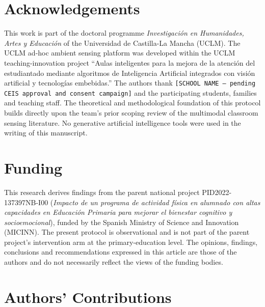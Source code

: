 
\section*{Acknowledgements}\label{sec:ack}

This work is part of the doctoral programme \emph{Investigación en Humanidades, Artes y Educación} of the Universidad de Castilla-La Mancha (UCLM). The UCLM ad-hoc ambient sensing platform was developed within the UCLM teaching-innovation project ``Aulas inteligentes para la mejora de la atención del estudiantado mediante algoritmos de Inteligencia Artificial integrados con visión artificial y tecnologías embebidas.'' The authors thank \texttt{[SCHOOL NAME --- pending CEIS approval and consent campaign]} and the participating students, families and teaching staff. The theoretical and methodological foundation of this protocol builds directly upon the team's prior scoping review of the multimodal classroom sensing literature. No generative artificial intelligence tools were used in the writing of this manuscript.

\section*{Funding}\label{sec:funding}

This research derives findings from the parent national project PID2022-137397NB-I00 (\emph{Impacto de un programa de actividad física en alumnado con altas capacidades en Educación Primaria para mejorar el bienestar cognitivo y socioemocional}), funded by the Spanish Ministry of Science and Innovation (MICINN). The present protocol is observational and is not part of the parent project's intervention arm at the primary-education level. The opinions, findings, conclusions and recommendations expressed in this article are those of the authors and do not necessarily reflect the views of the funding bodies.

\section*{Authors' Contributions}\label{sec:credit}

